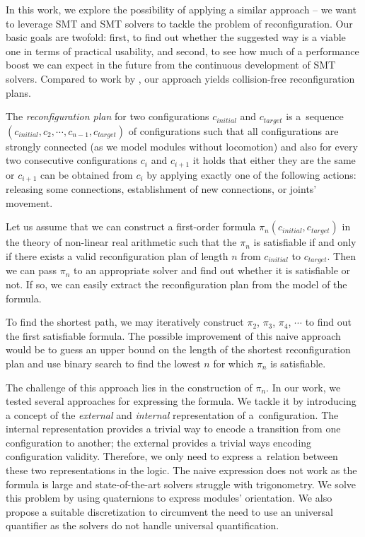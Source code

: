 In this work, we explore the possibility of applying a similar approach -- we
want to leverage SMT and SMT solvers to tackle the problem of reconfiguration.
Our basic goals are twofold: first, to find out whether the suggested way is a
viable one in terms of practical usability, and second, to see how much of a
performance boost we can expect in the future from the continuous development of
SMT solvers. Compared to work by \textcite{DBLP:journals/pcs/GorbenkoP12}, our
approach yields collision-free reconfiguration plans.

The \emph{reconfiguration plan} for two configurations $c_{initial}$ and
$c_{target}$ is a~sequence $(c_{initial}, c_2, \cdots, c_{n - 1}, c_{target})$
of configurations such that all configurations are strongly connected (as we
model modules without locomotion) and also for every two consecutive
configurations $c_i$ and $c_{i+1}$ it holds that either they are the same or
$c_{i+1}$ can be obtained from ${c_i}$  by applying exactly one of the following
actions: releasing some connections, establishment of new connections, or
joints' movement.

Let us assume that we can construct a first-order formula
$\pi_{n}(c_{initial}, c_{target})$ in the theory of non-linear real arithmetic
such that the $\pi_n$ is satisfiable if and only if there exists a valid
reconfiguration plan of length $n$ from $c_{initial}$ to $c_{target}$. Then we
can pass $\pi_n$ to an appropriate solver and find out whether it is satisfiable
or not. If so, we can easily extract the reconfiguration plan from the model of
the formula.

To find the shortest path, we may iteratively construct $\pi_2$,
$\pi_3$, $\pi_4$, $\cdots$ to find out the first satisfiable formula. The
possible improvement of this naive approach would be to guess an upper bound on the
length of the shortest reconfiguration plan and use binary search to find the
lowest $n$ for which $\pi_n$ is satisfiable.

The challenge of this approach lies in the construction of $\pi_n$. In our work,
we tested several approaches for expressing the formula. We tackle it by
introducing a concept of the \emph{external} and \emph{internal} representation
of a~configuration. The internal representation provides a trivial way to
encode a transition from one configuration to another; the external provides a
trivial ways encoding configuration validity. Therefore, we only need to express
a~relation between these two representations in the logic. The naive
expression does not work as the formula is large and state-of-the-art solvers
struggle with trigonometry. We solve this problem by using quaternions to
express modules' orientation. We also propose a suitable discretization to
circumvent the need to use an universal quantifier as the solvers do not handle
universal quantification.

